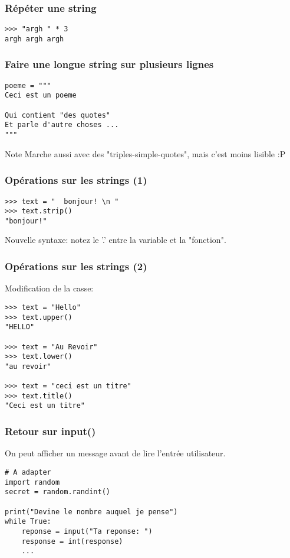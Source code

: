 \documentclass{beamer}
\begin{document}
\begin{frame}[fragile]
  \frametitle{Répéter une string}

\begin{lstlisting}
>>> "argh " * 3
argh argh argh
\end{lstlisting}

\end{frame}


\begin{frame}[fragile]
  \frametitle{Faire une longue string sur plusieurs lignes}

\begin{lstlisting}
poeme = """
Ceci est un poeme

Qui contient "des quotes"
Et parle d'autre choses ...
"""
\end{lstlisting}

\begin{block}{Note}
Marche aussi avec des "triples-simple-quotes", mais c'est moins lisible :P
\end{block}
\end{frame}


\begin{frame}[fragile]
  \frametitle{Opérations sur les strings (1)}

\begin{lstlisting}
>>> text = "  bonjour! \n "
>>> text.strip()
"bonjour!"
\end{lstlisting}
Nouvelle syntaxe: notez le '.' entre la variable et la "fonction".
\end{frame}

\begin{frame}[fragile]
  \frametitle{Opérations sur les strings (2)}

Modification de la casse:

\begin{lstlisting}
>>> text = "Hello"
>>> text.upper()
"HELLO"

>>> text = "Au Revoir"
>>> text.lower()
"au revoir"

>>> text = "ceci est un titre"
>>> text.title()
"Ceci est un titre"
\end{lstlisting}

\end{frame}



\begin{frame}[fragile]
  \frametitle{Retour sur input()}
On peut afficher un message avant de lire l'entrée utilisateur.

\begin{lstlisting}
# A adapter
import random
secret = random.randint()

print("Devine le nombre auquel je pense")
while True:
    reponse = input("Ta reponse: ")
    response = int(response)
    ...
\end{lstlisting}


\end{frame}
\end{document}

